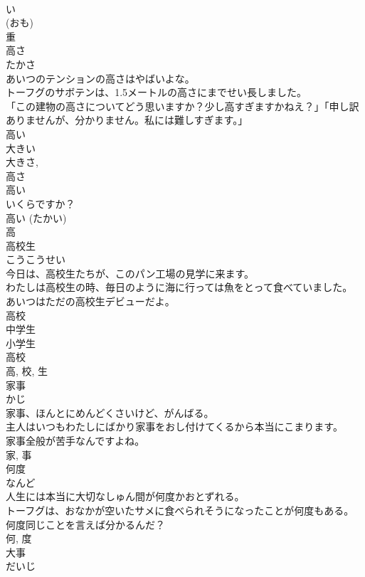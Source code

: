 \documentclass[8pt]{extreport}
\begin{document}
\begin{CJK}{UTF8}{min}
\\	い 
\\	(おも) 
\\	重	
\\	高さ	
\\	たかさ	
\\	あいつのテンションの高さはやばいよな。	
\\	トーフグのサボテンは、1.5メートルの高さにまでせい長しました。	
\\	「この建物の高さについてどう思いますか？少し高すぎますかねえ？」「申し訳ありませんが、分かりません。私には難しすぎます。」	
\\	高い 
\\	大きい 
\\	大きさ, 
\\	高さ 
\\	高い 
\\	いくらですか？ 
\\	高い (たかい) 
\\	高	
\\	高校生	
\\	こうこうせい	
\\	今日は、高校生たちが、このパン工場の見学に来ます。	
\\	わたしは高校生の時、毎日のように海に行っては魚をとって食べていました。	
\\	あいつはただの高校生デビューだよ。	
\\	高校 
\\	中学生 
\\	小学生 
\\	高校 
\\	高, 校, 生	
\\	家事	
\\	かじ	
\\	家事、ほんとにめんどくさいけど、がんばる。	
\\	主人はいつもわたしにばかり家事をおし付けてくるから本当にこまります。	
\\	家事全般が苦手なんですよね。	
\\	家, 事	
\\	何度	
\\	なんど	
\\	人生には本当に大切なしゅん間が何度かおとずれる。	
\\	トーフグは、おなかが空いたサメに食べられそうになったことが何度もある。	
\\	何度同じことを言えば分かるんだ？	
\\	何, 度	
\\	大事	
\\	だいじ	

\end{CJK}
\end{document}
